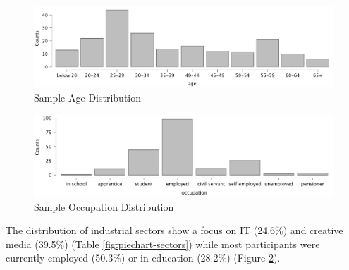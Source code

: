 \documentclass[
  a4paper,  %
  twoside,  %
  bibliography=totoc,
  headsepline,
  cleardoublepage=empty,
  parskip=half,
  draft=false
]{scrbook}
\begin{document}
\begin{figure}[h]
  \centering
  \includegraphics[width=1\textwidth]{graphics/statistics/age-plot.png}
  \caption{Sample Age Distribution}
  \label{fig:age-distribution}
\end{figure}
\begin{figure}[h]
  \centering
  \includegraphics[width=1\textwidth]{graphics/statistics/occupation.png}
  \caption{Sample Occupation Distribution}
  \label{fig:occupation-plot}
\end{figure}

The distribution of industrial sectors show a focus on IT (24.6\%) and creative media (39.5\%) (Table \ref{fig:piechart-sectors}) while most participants were currently employed (50.3\%) or in education (28.2\%) (Figure \ref{fig:occupation-plot}). 
\end{document}
